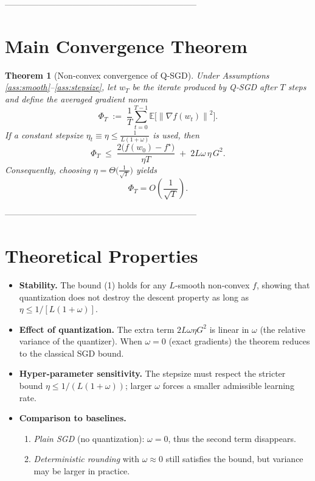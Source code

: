 \documentclass{article}
\newtheorem{theorem}{Theorem}
\newcommand{\E}{\mathbb{E}}
\newcommand{\norm}[1]{\left\|#1\right\|}
\begin{document}
--------------------------------------------------------------------

\section*{Main Convergence Theorem}
\begin{theorem}[Non‑convex convergence of Q‑SGD]\label{thm:main}
Under Assumptions \ref{ass:smooth}–\ref{ass:stepsize}, let $w_T$ be the iterate produced by Q‑SGD after $T$ steps and define the averaged gradient norm
\[
\Phi_T\;:=\;\frac{1}{T}\sum_{t=0}^{T-1}\E\big[\norm{\nabla f(w_t)}^2\big].
\]
If a constant stepsize $\eta_t\equiv\eta\le\frac{1}{L(1+\omega)}$ is used, then
\[
\Phi_T\;\le\;
\frac{2\big(f(w_0)-f^\star\big)}{\eta T}
\;+\;
2L\omega\,\eta\,G^2 .
\tag{1}
\]
Consequently, choosing $\eta=\Theta\!\big(\frac{1}{\sqrt{T}}\big)$ yields
\[
\Phi_T = O\!\left(\frac{1}{\sqrt{T}}\right).
\]
\end{theorem}

--------------------------------------------------------------------

\section*{Theoretical Properties}
\begin{itemize}
\item \textbf{Stability.} The bound (1) holds for any $L$‑smooth non‑convex $f$, showing that quantization does not destroy the descent property as long as $\eta\le1/[L(1+\omega)]$.
\item \textbf{Effect of quantization.} The extra term $2L\omega\eta G^2$ is linear in $\omega$ (the relative variance of the quantizer). When $\omega=0$ (exact gradients) the theorem reduces to the classical SGD bound.
\item \textbf{Hyper‑parameter sensitivity.} The stepsize must respect the stricter bound $\eta\le 1/(L(1+\omega))$; larger $\omega$ forces a smaller admissible learning rate.
\item \textbf{Comparison to baselines.}
    \begin{enumerate}
        \item \emph{Plain SGD} (no quantization): $\omega=0$, thus the second term disappears.
        \item \emph{Deterministic rounding} with $\omega\approx0$ still satisfies the bound, but variance may be larger in practice.
    \end{enumerate}
\end{itemize}
\end{document}

